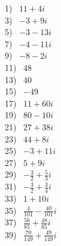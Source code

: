 \documentclass[11pt]{book}
\theoremstyle{definition}  %
\begin{document}
\begin{multicols}{2}
  1)~ $11+4i$\\
  3)~ $-3+9i$\\
  5)~ $-3-13i$\\
  7)~ $-4-11i$\\
  9)~ $-8-2i$\\
  11)~ $48$\\
  13)~ $40$\\
  15)~ $-49$\\
  17)~ $11+60i$\\
  19)~ $80-10i$\\
  21)~ $27+38i$\\
  23)~ $44+8i$\\
  25)~ $-3+11i$\\
  27)~ $5+9i$\\
  29)~ $-\frac{3}{2}+\frac{5}{3}i$\\
  31)~ $-\frac{3}{2}+\frac{3}{4}i$\\
  33)~ $1+10i$\\
  35)~ $\frac{4}{101}-\frac{40}{101}i$\\
  37)~ $\frac{56}{85}+\frac{48}{85}i$\\
  39)~ $\frac{70}{149}+\frac{49}{149}i$\\

\end{multicols}
\end{document}
